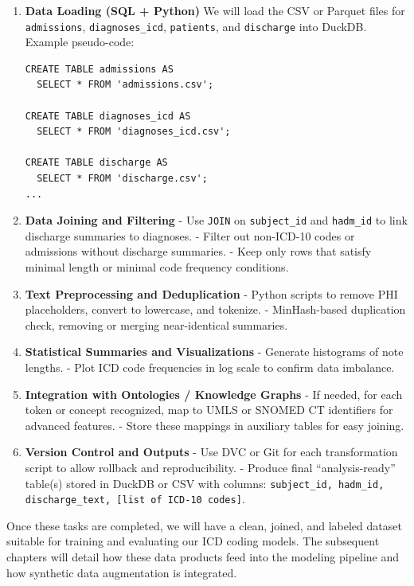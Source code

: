 \documentclass[12pt,a4paper]{report}
\begin{document}
\begin{enumerate}
    \item \textbf{Data Loading (SQL + Python)}  
    We will load the CSV or Parquet files for \texttt{admissions}, \texttt{diagnoses\_icd}, \texttt{patients}, and \texttt{discharge} into DuckDB. Example pseudo-code:
\begin{verbatim}
CREATE TABLE admissions AS
  SELECT * FROM 'admissions.csv';

CREATE TABLE diagnoses_icd AS
  SELECT * FROM 'diagnoses_icd.csv';

CREATE TABLE discharge AS
  SELECT * FROM 'discharge.csv';
...
\end{verbatim}
    \item \textbf{Data Joining and Filtering}  
    - Use \texttt{JOIN} on \texttt{subject\_id} and \texttt{hadm\_id} to link discharge summaries to diagnoses.  
    - Filter out non-ICD-10 codes or admissions without discharge summaries.  
    - Keep only rows that satisfy minimal length or minimal code frequency conditions.

    \item \textbf{Text Preprocessing and Deduplication}  
    - Python scripts to remove PHI placeholders, convert to lowercase, and tokenize.  
    - MinHash-based duplication check, removing or merging near-identical summaries.

    \item \textbf{Statistical Summaries and Visualizations}  
    - Generate histograms of note lengths.  
    - Plot ICD code frequencies in log scale to confirm data imbalance.  

    \item \textbf{Integration with Ontologies / Knowledge Graphs}  
    - If needed, for each token or concept recognized, map to UMLS or SNOMED CT identifiers for advanced features.  
    - Store these mappings in auxiliary tables for easy joining.

    \item \textbf{Version Control and Outputs}  
    - Use DVC or Git for each transformation script to allow rollback and reproducibility.  
    - Produce final “analysis-ready” table(s) stored in DuckDB or CSV with columns: \texttt{subject\_id, hadm\_id, discharge\_text, [list of ICD-10 codes]}.
\end{enumerate}

Once these tasks are completed, we will have a clean, joined, and labeled dataset suitable for training and evaluating our ICD coding models. The subsequent chapters will detail how these data products feed into the modeling pipeline and how synthetic data augmentation is integrated. 
\end{document}
